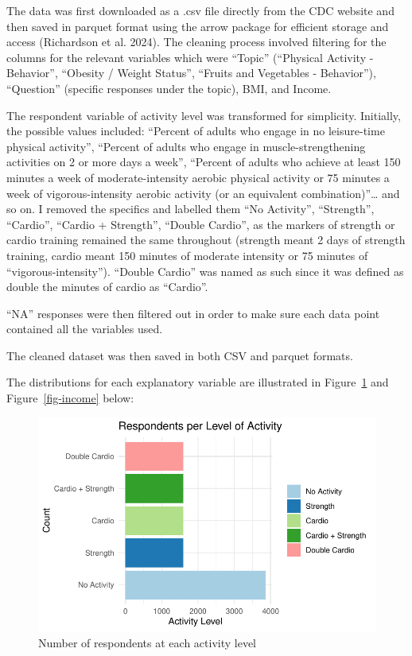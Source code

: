 \documentclass[
  letterpaper,
  DIV=11,
  numbers=noendperiod]{scrartcl}
\begin{document}
The data was first downloaded as a .csv file directly from the CDC
website and then saved in parquet format using the arrow package for
efficient storage and access (Richardson et al. 2024). The cleaning
process involved filtering for the columns for the relevant variables
which were ``Topic'' (``Physical Activity - Behavior'', ``Obesity /
Weight Status'', ``Fruits and Vegetables - Behavior''), ``Question''
(specific responses under the topic), BMI, and Income.

The respondent variable of activity level was transformed for
simplicity. Initially, the possible values included: ``Percent of adults
who engage in no leisure-time physical activity'', ``Percent of adults
who engage in muscle-strengthening activities on 2 or more days a
week'', ``Percent of adults who achieve at least 150 minutes a week of
moderate-intensity aerobic physical activity or 75 minutes a week of
vigorous-intensity aerobic activity (or an equivalent
combination)''\ldots{} and so on. I removed the specifics and labelled
them ``No Activity'', ``Strength'', ``Cardio'', ``Cardio + Strength'',
``Double Cardio'', as the markers of strength or cardio training
remained the same throughout (strength meant 2 days of strength
training, cardio meant 150 minutes of moderate intensity or 75 minutes
of ``vigorous-intensity''). ``Double Cardio'' was named as such since it
was defined as double the minutes of cardio as ``Cardio''.

``NA'' responses were then filtered out in order to make sure each data
point contained all the variables used.

The cleaned dataset was then saved in both CSV and parquet formats.

The distributions for each explanatory variable are illustrated in
Figure~\ref{fig-activity} and Figure~\ref{fig-income} below:

\begin{figure}

{\centering \includegraphics[width=\textwidth,height=0.2\textheight]{paper_files/figure-pdf/fig-activity-1.pdf}

}

\caption{\label{fig-activity}Number of respondents at each activity
level}

\end{figure}
\end{document}
